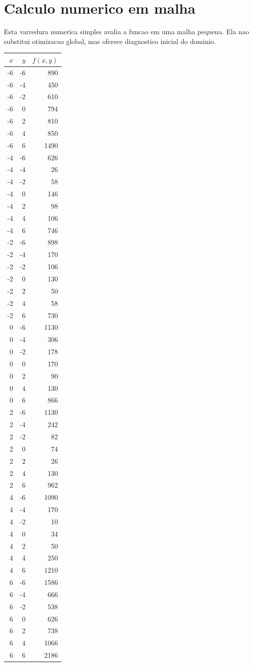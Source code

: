 \documentclass[11pt,a4paper]{article}
\begin{document}
\section{Calculo numerico em malha}
Esta varredura numerica simples avalia a funcao em uma malha pequena. Ela nao substitui otimizacao global, mas oferece diagnostico inicial do dominio.
\begin{center}
\begin{tabular}{rrr}
\toprule
$x$ & $y$ & $f(x,y)$\\
\midrule
-6 & -6 & 890\\
-6 & -4 & 450\\
-6 & -2 & 610\\
-6 & 0 & 794\\
-6 & 2 & 810\\
-6 & 4 & 850\\
-6 & 6 & 1490\\
-4 & -6 & 626\\
-4 & -4 & 26\\
-4 & -2 & 58\\
-4 & 0 & 146\\
-4 & 2 & 98\\
-4 & 4 & 106\\
-4 & 6 & 746\\
-2 & -6 & 898\\
-2 & -4 & 170\\
-2 & -2 & 106\\
-2 & 0 & 130\\
-2 & 2 & 50\\
-2 & 4 & 58\\
-2 & 6 & 730\\
0 & -6 & 1130\\
0 & -4 & 306\\
0 & -2 & 178\\
0 & 0 & 170\\
0 & 2 & 90\\
0 & 4 & 130\\
0 & 6 & 866\\
2 & -6 & 1130\\
2 & -4 & 242\\
2 & -2 & 82\\
2 & 0 & 74\\
2 & 2 & 26\\
2 & 4 & 130\\
2 & 6 & 962\\
4 & -6 & 1090\\
4 & -4 & 170\\
4 & -2 & 10\\
4 & 0 & 34\\
4 & 2 & 50\\
4 & 4 & 250\\
4 & 6 & 1210\\
6 & -6 & 1586\\
6 & -4 & 666\\
6 & -2 & 538\\
6 & 0 & 626\\
6 & 2 & 738\\
6 & 4 & 1066\\
6 & 6 & 2186\\
\bottomrule
\end{tabular}
\end{center}
\end{document}
